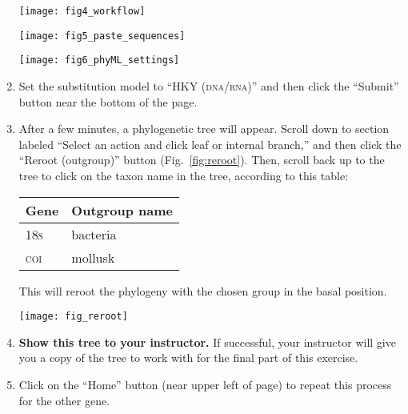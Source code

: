 \documentclass[12pt, hidelinks]{exam}
\begin{document}
\begin{enumerate}
\vfill

\begin{center}
	\texttt{[image: fig4\_workflow]}
\end{center}


\newpage

\begin{center}
	\texttt{[image: fig5\_paste\_sequences]}
\end{center}

\bigskip

\bigskip

\begin{center}
	\texttt{[image: fig6\_phyML\_settings]}
\end{center}

	\item  Set the substitution model to “HKY{} (\textsc{dna/rna})” and then click the “Submit” button near the bottom of the page.

	\item After a few minutes, a phylogenetic tree will appear. Scroll down to section labeled “Select an action and click leaf or internal branch,” and then click the “Reroot (outgroup)” button (Fig.~\ref{fig:reroot}).  Then, scroll back up to the tree to click on the taxon name in the tree, according to this table:
	
	{\centering\begin{tabular}{@{}ll@{}}
		\toprule
		Gene &	Outgroup name\\
		\midrule
		18\textsc{s}	&  bacteria\\
		\textsc{coi}	& mollusk\\
		\bottomrule		
	\end{tabular}\par}
	
	This will reroot the phylogeny with the chosen group in the basal position.

\begin{center}
	\texttt{[image: fig\_reroot]}
\end{center}
	
	\item 
	\textbf{Show this tree to your instructor.} If successful, your instructor will give you a copy of the tree to work with for the final part of this exercise. \label{final_step}

	\item Click on the “Home” button (near upper left of page) to repeat this process for the other gene.


\end{enumerate}
\end{document}
